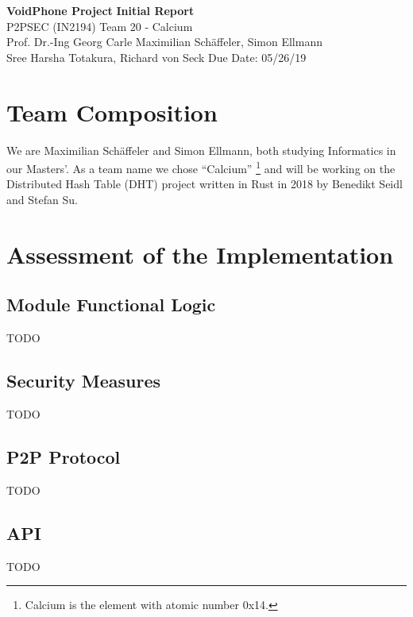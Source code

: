 \documentclass[a4paper, 11pt]{article}
\begin{document}
\noindent
\large\textbf{VoidPhone Project} \hfill \textbf{Initial Report} \\
\normalsize P2PSEC (IN2194)  \hfill Team 20 - Calcium\\
Prof. Dr.-Ing Georg Carle \hfill Maximilian Schäffeler, Simon Ellmann \\
Sree Harsha Totakura, Richard von Seck \hfill Due Date: 05/26/19

%

\section*{Team Composition}
We are Maximilian Schäffeler and Simon Ellmann, both studying Informatics in our Masters'. As a team name we chose ``Calcium'' \footnote{Calcium is the element with atomic number 0x14.} and will be working on the Distributed Hash Table (DHT) project written in Rust in 2018 by Benedikt Seidl and Stefan Su.


\section*{Assessment of the Implementation}
\subsection{Module Functional Logic}
TODO

\subsection{Security Measures}
TODO

\subsection{P2P Protocol}
TODO

\subsection{API}
TODO
\end{document}
